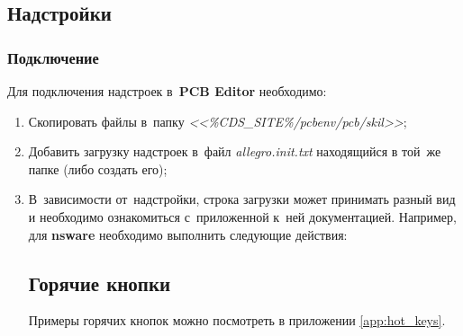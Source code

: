 \newpage
\subsection{Надстройки} \label{ssec:pcb_plugin}



\subsubsection{Подключение} \label{sssec:pcb_plugin_setup}

Для подключения надстроек в~\textbf{PCB Editor} необходимо:
\begin{enumerate}
	\item Скопировать файлы в~папку \textit{<<\%CDS\_SITE\%/pcbenv/pcb/skil>>};
	\item Добавить загрузку надстроек в~файл \textit{allegro.init.txt} находящийся в той~же папке (либо создать его);
	\item В~зависимости от~надстройки, строка загрузки может принимать разный вид и необходимо ознакомиться с~приложенной к~ней документацией. Например, для \textbf{nsware} необходимо выполнить следующие действия:
	\begin{figure}[H]
	\end{figure}
	
	
	 
\newpage
\subsection{Горячие кнопки} \label{ssec:hot_keys}
	 
	 Примеры горячих кнопок можно посмотреть в приложении \ref{app:hot_keys}.
	 
\end{enumerate}